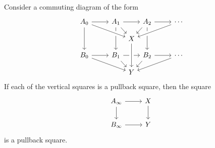 \begin{cor}
Consider a commuting diagram of the form
\begin{equation*}
\begin{tikzcd}[column sep=small,row sep=small]
A_0 \arrow[rr] \arrow[dd] & & A_1 \arrow[rr] \arrow[dr] \arrow[dd] &[-.9em] &[-.9em] A_2 \arrow[dl] \arrow[dd] & & \cdots \\
& & & X \arrow[from=ulll,crossing over] \arrow[from=urrr,crossing over] \arrow[from=ur,to=urrr] \\
B_0 \arrow[rr] \arrow[drrr] & & B_1 \arrow[rr] \arrow[dr] & & B_2 \arrow[rr] \arrow[dl] & & \cdots \arrow[dlll] \\
& & & Y \arrow[from=uu,crossing over] 
\end{tikzcd}
\end{equation*}
If each of the vertical squares is a pullback square, then the square
\begin{equation*}
\begin{tikzcd}
A_\infty \arrow[r] \arrow[d] & X \arrow[d] \\
B_\infty \arrow[r] & Y
\end{tikzcd}
\end{equation*} 
is a pullback square.
\end{cor}

